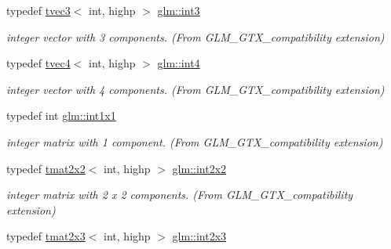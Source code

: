 \begin{DoxyCompactItemize}
\mbox{\label{group__gtx__compatibility_gafc297ec294f5aa0360a634656c20e1d0}} 
typedef \hyperlink{structglm_1_1tvec3}{tvec3}$<$ int, highp $>$ \hyperlink{group__gtx__compatibility_gafc297ec294f5aa0360a634656c20e1d0}{glm\+::int3}
\begin{DoxyCompactList}\small\item\em integer vector with 3 components. (From G\+L\+M\+\_\+\+G\+T\+X\+\_\+compatibility extension) \end{DoxyCompactList}\item 
\mbox{\label{group__gtx__compatibility_gab93125af983ab22b9647b64770b26aa1}} 
typedef \hyperlink{structglm_1_1tvec4}{tvec4}$<$ int, highp $>$ \hyperlink{group__gtx__compatibility_gab93125af983ab22b9647b64770b26aa1}{glm\+::int4}
\begin{DoxyCompactList}\small\item\em integer vector with 4 components. (From G\+L\+M\+\_\+\+G\+T\+X\+\_\+compatibility extension) \end{DoxyCompactList}\item 
\mbox{\label{group__gtx__compatibility_ga09016a637a3cd093c22e6188080ac750}} 
typedef int \hyperlink{group__gtx__compatibility_ga09016a637a3cd093c22e6188080ac750}{glm\+::int1x1}
\begin{DoxyCompactList}\small\item\em integer matrix with 1 component. (From G\+L\+M\+\_\+\+G\+T\+X\+\_\+compatibility extension) \end{DoxyCompactList}\item 
\mbox{\label{group__gtx__compatibility_ga5f407f808d8fa5b771ea7417cedc4868}} 
typedef \hyperlink{structglm_1_1tmat2x2}{tmat2x2}$<$ int, highp $>$ \hyperlink{group__gtx__compatibility_ga5f407f808d8fa5b771ea7417cedc4868}{glm\+::int2x2}
\begin{DoxyCompactList}\small\item\em integer matrix with 2 x 2 components. (From G\+L\+M\+\_\+\+G\+T\+X\+\_\+compatibility extension) \end{DoxyCompactList}\item 
\mbox{\label{group__gtx__compatibility_ga37b2b18255fa5ff7fa23d8b1d34b8034}} 
typedef \hyperlink{structglm_1_1tmat2x3}{tmat2x3}$<$ int, highp $>$ \hyperlink{group__gtx__compatibility_ga37b2b18255fa5ff7fa23d8b1d34b8034}{glm\+::int2x3}

\end{DoxyCompactItemize}

